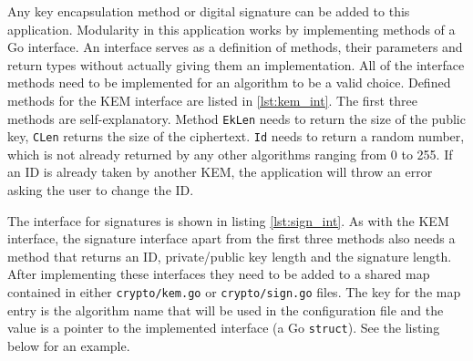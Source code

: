 Any key encapsulation method or digital signature can be added to this application. Modularity in this application works by implementing methods of a Go interface. An interface serves as a definition of methods, their parameters and return types without actually giving them an implementation. All of the interface methods need to be implemented for an algorithm to be a valid choice. Defined methods for the KEM interface are listed in \ref{lst:kem_int}. The first three methods are self-explanatory. Method \texttt{EkLen} needs to return the size of the public key, \texttt{CLen} returns the size of the ciphertext. \texttt{Id} needs to return a random number, which is not already returned by any other algorithms ranging from 0 to 255. If an ID is already taken by another KEM, the application will throw an error asking the user to change the ID.

The interface for signatures is shown in listing \ref{lst:sign_int}. As with the KEM interface, the signature interface apart from the first three methods also needs a method that returns an ID, private/public key length and the signature length. After implementing these interfaces they need to be added to a shared map contained in either \texttt{crypto/kem.go} or \texttt{crypto/sign.go} files. The key for the map entry is the algorithm name that will be used in the configuration file and the value is a pointer to the implemented interface (a Go \texttt{struct}). See the listing below for an example.
